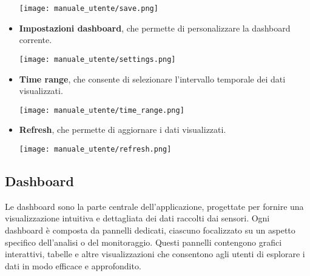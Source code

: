 \begin{itemize}
        \begin{center}
            \texttt{[image: manuale\_utente/save.png]}
        \end{center}
    \item \textbf{Impostazioni dashboard}, che permette di personalizzare la dashboard corrente.
        \begin{center}
            \texttt{[image: manuale\_utente/settings.png]}
        \end{center}
    \newpage
    \item \textbf{Time range}, che consente di selezionare l'intervallo temporale dei dati visualizzati.
        \begin{center}
            \texttt{[image: manuale\_utente/time\_range.png]}
        \end{center}
    \item \textbf{Refresh}, che permette di aggiornare i dati visualizzati.
        \begin{center}
            \texttt{[image: manuale\_utente/refresh.png]}
        \end{center}
\end{itemize}
\newpage
\subsection{Dashboard}
Le dashboard sono la parte centrale dell'applicazione, progettate per fornire una visualizzazione intuitiva e dettagliata dei dati raccolti dai sensori. Ogni dashboard è composta da pannelli dedicati, ciascuno focalizzato su un aspetto specifico dell'analisi o del monitoraggio. Questi pannelli contengono grafici interattivi, tabelle e altre visualizzazioni che consentono agli utenti di esplorare i dati in modo efficace e approfondito.

